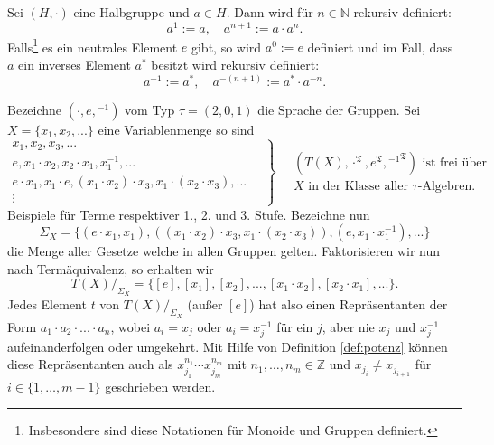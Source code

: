 
\begin{definition}\label{def:potenz}
    Sei $(H,\cdot)$ eine Halbgruppe und $a\in H$. Dann wird für $n\in\mathbb{N}$ rekursiv definiert:
    \[a^1:=a,\quad a^{n+1}:=a\cdot a^n.\]
    Falls\footnote{Insbesondere sind diese Notationen für Monoide und Gruppen definiert.} es ein neutrales Element $e$ gibt, so wird $a^0:=e$ definiert und im Fall, dass $a$ ein inverses Element $a^*$ besitzt
    wird rekursiv definiert:
    \[a^{-1}:=a^*,\quad a^{-(n+1)}:=a^*\cdot a^{-n}.\]
\end{definition}

\begin{example}\label{ex:gruppenterme}
    Bezeichne $(\cdot, e, {}^{-1})$ vom Typ $\tau = (2,0,1)$ die Sprache der Gruppen. Sei $X = \{ x_1, x_2, ... \}$ eine Variablenmenge so sind
    $$ \left. \begin{matrix} x_1, x_2, x_3, ... \\ e, x_1 \cdot x_2, x_2 \cdot x_1, x_1^{-1}, ... \\ e \cdot x_1, x_1 \cdot e, (x_1 \cdot x_2) \cdot x_3, x_1 \cdot (x_2 \cdot x_3), ... \\ \vdots \end{matrix} \quad \right\} \quad \begin{matrix} (T(X), \cdot^\mathfrak{T}, e^\mathfrak{T}, {{}^{-1}}^\mathfrak{T}) \textrm{ ist frei über} \\ X \textrm{ in der Klasse aller $\tau$-Algebren.} \end{matrix} $$
    Beispiele für Terme respektiver 1., 2. und 3. Stufe. Bezeichne nun
    $$ \Sigma_X = \{ (e \cdot x_1, x_1), ((x_1 \cdot x_2) \cdot x_3, x_1 \cdot (x_2 \cdot x_3)), (e, x_1 \cdot x_1^{-1}), ... \} $$
    die Menge aller Gesetze welche in allen Gruppen gelten. Faktorisieren wir nun nach Term\-äquivalenz, so erhalten wir
    $$ T(X) /_{\Sigma_X} = \{ [e], [x_1], [x_2], ..., [x_1 \cdot x_2], [x_2 \cdot x_1], ... \}. $$
    Jedes Element $t$ von $T(X) /_{\Sigma_X}$ (außer $[e]$) hat also einen Repräsentanten der Form $a_1 \cdot a_2 \cdot ... \cdot a_n$, wobei $a_i = x_j$ oder $a_i = x_j^{-1}$ für ein $j$, aber nie $x_j$ und $x_j^{-1}$ aufeinanderfolgen oder umgekehrt.
    Mit Hilfe von Definition \ref*{def:potenz} können diese Repräsentanten auch als $x_{j_1}^{n_1}\cdots x_{j_m}^{n_m}$ mit $n_1,\ldots,n_m\in\mathbb{Z}$ und $x_{j_i}\neq x_{j_{i+1}}$
    für $i\in\{1,\ldots,m-1\}$ geschrieben werden.
\end{example}

